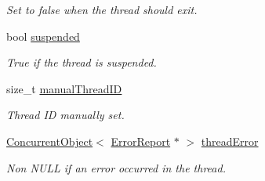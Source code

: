 \begin{DoxyCompactItemize}
\begin{DoxyCompactList}\small\item\em Set to false when the thread should exit. \item\end{DoxyCompactList}\item 
bool \hyperlink{class_thread_single_a710b7388ce616e858f776efab32fbe61}{suspended}
\begin{DoxyCompactList}\small\item\em True if the thread is suspended. \item\end{DoxyCompactList}\item 
\hypertarget{class_thread_single_a43cc2e11c57294cfcf6f61ef9754f70b}{
size\_\-t \hyperlink{class_thread_single_a43cc2e11c57294cfcf6f61ef9754f70b}{manualThreadID}}
\label{class_thread_single_a43cc2e11c57294cfcf6f61ef9754f70b}

\begin{DoxyCompactList}\small\item\em Thread ID manually set. \item\end{DoxyCompactList}\item 
\hypertarget{class_thread_single_ad1453b840d770d717080d07f8b082286}{
\hyperlink{class_concurrent_object}{ConcurrentObject}$<$ \hyperlink{class_error_report}{ErrorReport} $\ast$ $>$ \hyperlink{class_thread_single_ad1453b840d770d717080d07f8b082286}{threadError}}
\label{class_thread_single_ad1453b840d770d717080d07f8b082286}

\begin{DoxyCompactList}\small\item\em Non NULL if an error occurred in the thread. \item\end{DoxyCompactList}\end{DoxyCompactItemize}
